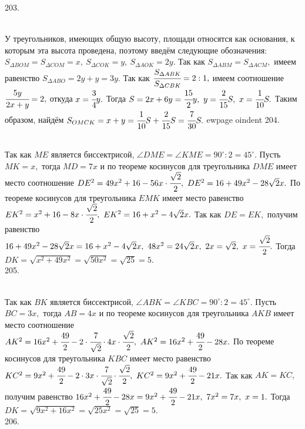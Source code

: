 203. \begin{figure}[ht!]
\end{figure}\\
У треугольников, имеющих общую высоту, площади относятся как основания, к которым эта высота проведена, поэтому введём следующие обозначения: $S_{\Delta BOM}=S_{\Delta COM}=x,\ S_{\Delta COK}=y,\ S_{\Delta AOK}=2y.$ Так как $S_{\Delta ABM}=S_{\Delta ACM},$ имеем равенство $S_{\Delta ABO}=2y+y=3y.$
Так как $\cfrac{S_{\Delta ABK}}{S_{\Delta CBK}}=2:1,$ имеем соотношение
$\cfrac{5y}{2x+y}=2,$ откуда $x=\cfrac{3}{4}y.$ Тогда $S=2x+6y=\cfrac{15}{2}y,\ y=\cfrac{2}{15}S,\ x=\cfrac{1}{10}S.$ Таким образом, найдём
$S_{OMCK}=x+y=\cfrac{1}{10}S+\cfrac{2}{15}S=\cfrac{7}{30}S.$
ewpage
oindent
204. \begin{figure}[ht!]
\end{figure}\\
Так как $ME$ является биссектрисой, $\angle DME=\angle KME=90^\circ:2=45^\circ.$ Пусть $MK=x,$ тогда $MD=7x$ и по теореме косинусов для треугольника $DME$ имеет место соотношение $DE^2=49x^2+16-56x\cdot \cfrac{\sqrt{2}}{2},\ DE^2=16+49x^2-28\sqrt{2}x.$ По теореме косинусов для треугольника $EMK$ имеет место равенство $EK^2=x^2+16-8x\cdot \cfrac{\sqrt{2}}{2},\ EK^2=16+x^2-4\sqrt{2}x.$ Так как $DE=EK,$ получим равенство $16+49x^2-28\sqrt{2}x=16+x^2-4\sqrt{2}x,\ 48x^2=24\sqrt{2}x,\ 2x=\sqrt{2},\ x=\cfrac{\sqrt{2}}{2}.$ Тогда $DK=\sqrt{x^2+49x^2}=\sqrt{50x^2}=\sqrt{25}=5.$\\
205. \begin{figure}[ht!]
\end{figure}\\
Так как $BK$ является биссектрисой, $\angle ABK=\angle KBC=90^\circ:2=45^\circ.$ Пусть $BC=3x,$ тогда $AB=4x$ и по теореме косинусов для треугольника $AKB$ имеет место соотношение $AK^2=16x^2+\cfrac{49}{2}-2\cdot\cfrac{7}{\sqrt{2}}\cdot 4x\cdot \cfrac{\sqrt{2}}{2},\ AK^2=16x^2+\cfrac{49}{2}-28x.$ По теореме косинусов для треугольника $KBC$ имеет место равенство $KC^2=9x^2+\cfrac{49}{2}-2\cdot 3x\cdot\cfrac{7}{\sqrt{2}}\cdot \cfrac{\sqrt{2}}{2},\ KC^2=9x^2+\cfrac{49}{2}-21x.$ Так как $AK=KC,$ получим равенство $16x^2+\cfrac{49}{2}-28x=9x^2+\cfrac{49}{2}-21x,\ 7x^2=7x,\ x=1.$ Тогда $DK=\sqrt{9x^2+16x^2}=\sqrt{25x^2}=\sqrt{25}=5.$\\
206. \begin{figure}[ht!]
\end{figure}\\
